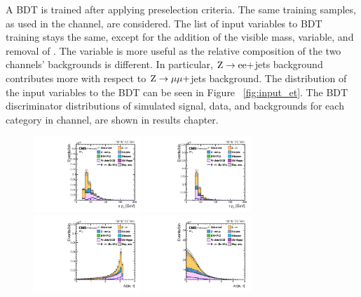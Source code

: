 A BDT is trained after applying preselection criteria. The same training samples, as used in the \Hmuhad channel, are considered. The list of input variables to BDT training stays the same, except for the addition of the visible mass, \mvis variable, and removal of \ptvecmiss. The \mvis variable is more useful as the relative composition of the two channels' backgrounds is different. In particular, $\text{Z} \to \text{e} \text{e}+$jets background contributes more with respect to $\text{Z} \to \mu \mu+$jets background. The distribution of the input variables to the BDT can be seen in Figure ~\ref{fig:input_et}. The BDT discriminator distributions of simulated signal, data, and backgrounds for each category in \Hehad channel, are shown in results chapter.

\begin{figure}[htbp!]
  \centering
  \includegraphics[width=0.36\textwidth]{plots/chapter6/etau/ePt.pdf}
  \includegraphics[width=0.36\textwidth]{plots/chapter6/etau/tPt.pdf}\\
  \includegraphics[width=0.36\textwidth]{plots/chapter6/etau/dPhiETau.pdf}
  \includegraphics[width=0.36\textwidth]{plots/chapter6/etau/dEtaETau.pdf}\\

\end{figure}
